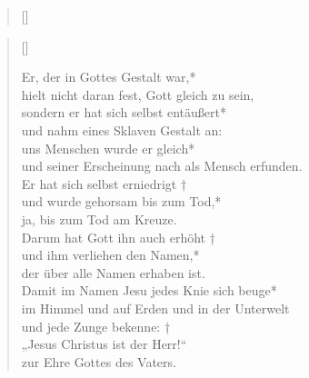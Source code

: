 \begin{verse}[\versewidth]
 
\end{verse}


\vspace{0.6cm}



\begin{verse}[\versewidth]


Er, der in Gottes Gestalt war,*\\
hielt nicht daran fest, Gott gleich zu sein,\\
\vin sondern er hat sich selbst entäußert*\\
\vin und nahm eines Sklaven Gestalt an:\\
uns Menschen wurde er gleich*\\
und seiner Erscheinung nach als Mensch erfunden.\\
\vin Er hat sich selbst erniedrigt †\\
\vin und wurde gehorsam bis zum Tod,*\\
\vin ja, bis zum Tod am Kreuze.\\
Darum hat Gott ihn auch erhöht †\\
und ihm verliehen den Namen,*\\
der über alle Namen erhaben ist.\\
\vin Damit im Namen Jesu jedes Knie sich beuge*\\
\vin im Himmel und auf Erden und in der Unterwelt\\
und jede Zunge bekenne: †\\
„Jesus Christus ist der Herr!“\\
zur Ehre Gottes des Vaters.\\	

\end{verse}